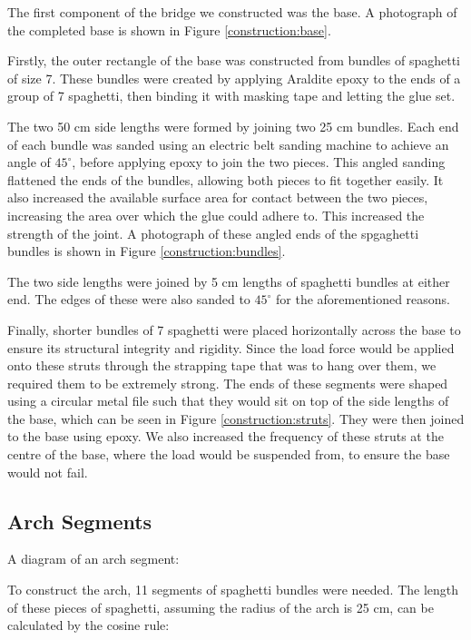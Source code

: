 \documentclass[a4paper,11pt]{article}
\begin{document}
The first component of the bridge we constructed was the base.
A photograph of the completed base is shown in Figure \ref{construction:base}.

Firstly, the outer rectangle of the base was constructed from bundles of
spaghetti of size 7.
These bundles were created by applying Araldite epoxy to the ends of a group of
7 spaghetti, then binding it with masking tape and letting the glue set.

The two 50 cm side lengths were formed by joining two 25 cm bundles.
Each end of each bundle was sanded using an electric belt sanding machine to
achieve an angle of $45^\circ$, before applying epoxy to join the two pieces.
This angled sanding flattened the ends of the bundles, allowing both pieces to
fit together easily. It also increased the available surface area for contact
between the two pieces, increasing the area over which the glue could adhere to.
This increased the strength of the joint.
A photograph of these angled ends of the spgaghetti bundles is shown in Figure
\ref{construction:bundles}.

The two side lengths were joined by 5 cm lengths of spaghetti bundles at either
end. The edges of these were also sanded to $45^\circ$ for the aforementioned
reasons.

Finally, shorter bundles of 7 spaghetti were placed horizontally across the base
to ensure its structural integrity and rigidity.
Since the load force would be applied onto these struts through the strapping
tape that was to hang over them, we required them to be extremely strong.
The ends of these segments were shaped using a circular metal file such that
they would sit on top of the side lengths of the base, which can be seen in
Figure \ref{construction:struts}.
They were then joined to the base using epoxy.
We also increased the frequency of these struts at the centre of the base,
where the load would be suspended from, to ensure the base would not fail.


\subsection{Arch Segments}

A diagram of an arch segment:

\vspace{4cm}

To construct the arch, 11 segments of spaghetti bundles were needed.
The length of these pieces of spaghetti, assuming the radius of the arch is 25
cm, can be calculated by the cosine rule:
\end{document}
